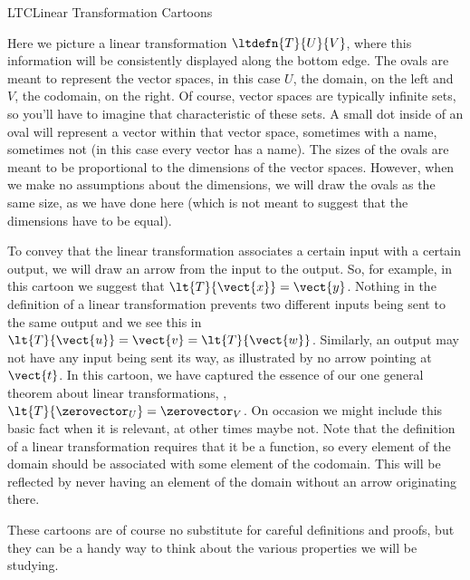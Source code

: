 \begin{subsect}{LTC}{Linear Transformation Cartoons}
\begin{para}
\end{para}
%
\begin{para}Here we picture a linear transformation $\ltdefn{T}{U}{V}$, where this information will be consistently displayed along the bottom edge.  The ovals are meant to represent the vector spaces, in this case $U$, the domain, on the left and $V$, the codomain, on the right.  Of course, vector spaces are typically infinite sets, so you'll have to imagine that characteristic of these sets.  A small dot inside of an oval will represent a vector within that vector space, sometimes with a name, sometimes not (in this case every vector has a name).  The sizes of the ovals are meant to be proportional to the dimensions of the vector spaces.  However, when we make no assumptions about the dimensions, we will draw the ovals as the same size, as we have done here (which is not meant to suggest that the dimensions have to be equal).\end{para}
%
\begin{para}To convey that the linear transformation associates a certain input with a certain output, we will draw an arrow from the input to the output.  So, for example, in this cartoon we suggest that $\lt{T}{\vect{x}}=\vect{y}$.  Nothing in the definition of a linear transformation prevents two different inputs being sent to the same output and we see this in $\lt{T}{\vect{u}}=\vect{v}=\lt{T}{\vect{w}}$.  Similarly, an output may not have any input being sent its way, as illustrated by no arrow pointing at $\vect{t}$.  In this cartoon, we have captured the essence of our one general theorem about linear transformations, , $\lt{T}{\zerovector_U}=\zerovector_V$.  On occasion we might include this basic fact when it is relevant, at other times maybe not.  Note that the definition of a linear transformation requires that it be a function, so every element of the domain should be associated with some element of the codomain.  This will be reflected by never having an element of the domain without an arrow originating there.\end{para}
%
\begin{para}These cartoons are of course no substitute for careful definitions and proofs, but they can be a handy way to think about the various properties we will be studying.\end{para}
%
\end{subsect}
%

